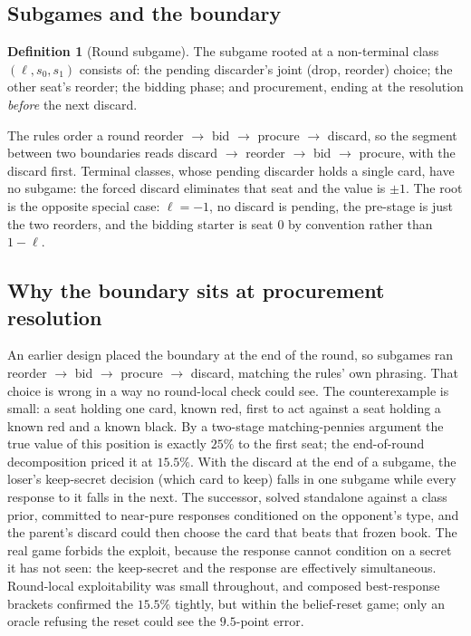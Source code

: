 \documentclass[11pt]{article}
\theoremstyle{plain}
\theoremstyle{definition}
\newtheorem{definition}[theorem]{Definition}
\theoremstyle{remark}
\begin{document}
\subsection{Subgames and the boundary}\label{sec:subgames}

\begin{definition}[Round subgame]\label{def:subgame}
The subgame rooted at a non-terminal class $(\ell,s_0,s_1)$ consists of:
the pending discarder's joint (drop, reorder) choice; the other seat's
reorder; the bidding phase; and procurement, ending at the resolution
\emph{before} the next discard.
\end{definition}

The rules order a round reorder $\to$ bid $\to$ procure $\to$ discard, so the
segment between two boundaries reads discard $\to$ reorder $\to$ bid $\to$
procure, with the discard first. Terminal classes, whose pending discarder holds
a single card, have no subgame: the forced discard eliminates that seat and the
value is $\pm1$. The root is the opposite special case: $\ell=-1$, no discard is
pending, the pre-stage is just the two reorders, and the bidding starter is seat
$0$ by convention rather than $1-\ell$.

\subsection{Why the boundary sits at procurement resolution}
\label{sec:boundary}

An earlier design placed the boundary at the end of the round, so subgames ran
reorder $\to$ bid $\to$ procure $\to$ discard, matching the rules' own phrasing.
That choice is wrong in a way no round-local check could see. The counterexample
is small: a seat holding one card, known red, first to act against a seat
holding a known red and a known black. By a two-stage matching-pennies argument
the true value of this position is exactly $25\%$ to the first seat; the
end-of-round decomposition priced it at $15.5\%$. With the discard at the end of
a subgame, the loser's keep-secret decision (which card to keep) falls in one
subgame while every response to it falls in the next. The successor, solved
standalone against a class prior, committed to near-pure responses conditioned
on the opponent's type, and the parent's discard could then choose the card that
beats that frozen book. The real game forbids the exploit, because the response
cannot condition on a secret it has not seen: the keep-secret and the response
are effectively simultaneous. Round-local exploitability was small throughout,
and composed best-response brackets confirmed the $15.5\%$ tightly, but within
the belief-reset game; only an oracle refusing the reset could see the
$9.5$-point error.
\end{document}
